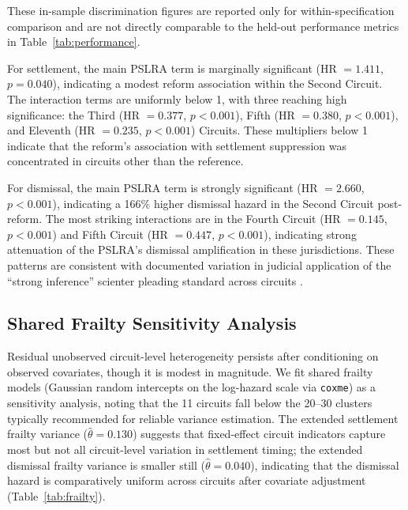 These in-sample discrimination figures are reported only for
within-specification comparison and are not directly
comparable to the held-out performance metrics in
Table~\ref{tab:performance}.

For settlement, the main PSLRA term is marginally
significant (HR $= 1.411$, $p = 0.040$), indicating a
modest reform association within the Second Circuit. The
interaction terms are uniformly below 1, with three
reaching high significance: the Third (HR $= 0.377$,
$p < 0.001$), Fifth (HR $= 0.380$, $p < 0.001$), and
Eleventh (HR $= 0.235$, $p < 0.001$) Circuits. These
multipliers below 1 indicate that the reform's association
with settlement suppression was concentrated in circuits
other than the reference.

For dismissal, the main PSLRA term is strongly significant
(HR $= 2.660$, $p < 0.001$), indicating a 166\% higher
dismissal hazard in the Second Circuit post-reform. The most
striking interactions are in the Fourth Circuit
(HR $= 0.145$, $p < 0.001$) and Fifth Circuit
(HR $= 0.447$, $p < 0.001$), indicating strong attenuation
of the PSLRA's dismissal amplification in these
jurisdictions.
These patterns are consistent with documented variation in
judicial application of the ``strong inference'' scienter
pleading standard across circuits
\citep{johnson2001, choi2007}.

\subsection{Shared Frailty Sensitivity Analysis}
\label{sec:frailty}

Residual unobserved circuit-level heterogeneity persists
after conditioning on observed covariates, though it is
modest in magnitude. We fit shared frailty models
(Gaussian random intercepts on the log-hazard scale via
\texttt{coxme}) as a sensitivity analysis, noting that the
11 circuits fall below the 20--30 clusters typically
recommended for reliable variance estimation. The extended
settlement frailty variance ($\hat{\theta} = 0.130$)
suggests that fixed-effect circuit indicators capture most
but not all circuit-level variation in settlement timing; the
extended dismissal frailty variance is smaller still
($\hat{\theta} = 0.040$), indicating that the dismissal
hazard is comparatively uniform across circuits after
covariate adjustment (Table~\ref{tab:frailty}).

